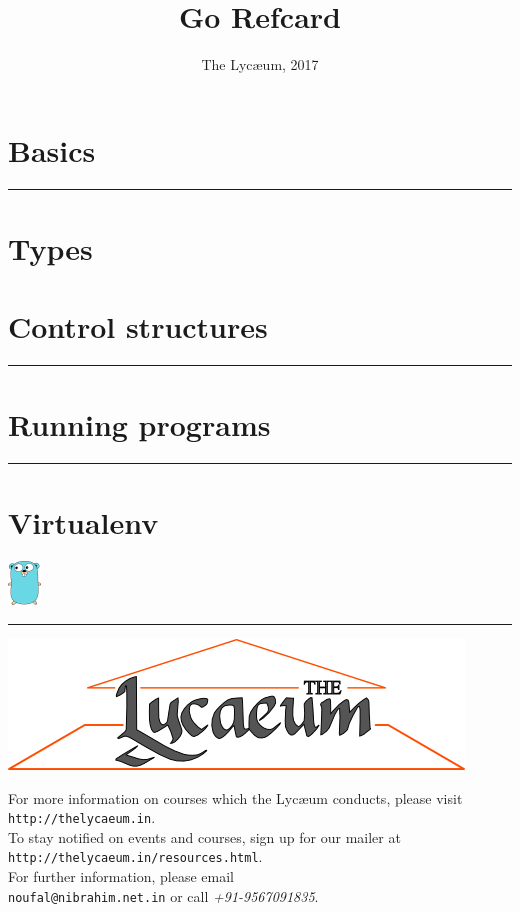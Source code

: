 \documentclass{../refsheet}
\title{Go Refcard}
\author{The Lyc\ae{}um, 2017}
\date{}
\begin{document}
\maketitle
\section{Basics}





\noindent\rule{\linewidth}{0.05ex}
\section{Types}


\section{Control structures}
% 
% 
% 
% 
% 
% 

\noindent\rule{\linewidth}{0.05ex}
\section{Running programs}

\noindent\rule{\linewidth}{0.05ex}
\section{Virtualenv}
\includegraphics{../images/golang-small.png}

\noindent\rule{\linewidth}{0.05ex}
\begin{center}
\includegraphics[scale=0.4]{../images/parthenon-callig.png}
\end{center}
For more information on courses which the Lyc\ae{}um conducts, please
visit \texttt{http://thelycaeum.in}. \\To stay notified on events and
courses, sign up for our mailer at \texttt{http://thelycaeum.in/resources.html}. \\For further
information, please email \\\texttt{noufal@nibrahim.net.in} or call
\textit{+91-9567091835}.
\vspace{0.5cm}
\end{document}
